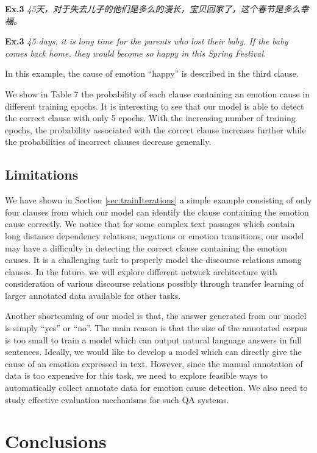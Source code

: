 \documentclass[11pt,letterpaper]{article}
\begin{document}
\begin{CJK*}{UTF8}{gbsn}
\noindent \textbf{Ex.3} \emph{45天，对于失去儿子的他们是多么的漫长，宝贝回家了，这个春节是多么幸福。}

\noindent \textbf{Ex.3} \emph{45 days, it is long time for the parents who lost their baby. If the baby comes back home, they would become so happy in this Spring Festival.}

In this example, the cause of emotion ``happy'' is described in the third clause. 

We show in Table 7 the probability of each clause containing an emotion cause in different training epochs. It is interesting to see that our model is able to detect the correct clause with only 5 epochs. With the increasing number of training epochs, the probability associated with the correct clause increases further while the probabilities of incorrect clauses decrease generally.



\subsection{Limitations}
\label{sec:limitations}

We have shown in Section \ref{sec:trainIterations} a simple example consisting of only four clauses from which our model can identify the clause containing the emotion cause correctly. We notice that for some complex text passages which contain long distance dependency relations, negations or emotion transitions, our model may have a difficulty in detecting the correct clause containing the emotion causes. It is a challenging task to properly model the discourse relations among clauses. In the future, we will explore different network architecture with consideration of various discourse relations possibly through transfer learning of larger annotated data available for other tasks. 

Another shortcoming of our model is that, the answer generated from our model is simply ``yes'' or ``no''. The main reason is that the size of the annotated corpus is too small to train a model which can output natural language answers in full sentences. Ideally, we would like to develop a model which can directly give the cause of an emotion expressed in text. However, since the manual annotation of data is too expensive for this task, we need to explore feasible ways to automatically collect annotate data for emotion cause detection. We also need to study effective evaluation mechanisms for such QA systems.


\section{Conclusions}
\label{sec:section5}


\end{CJK*}
\end{document}
